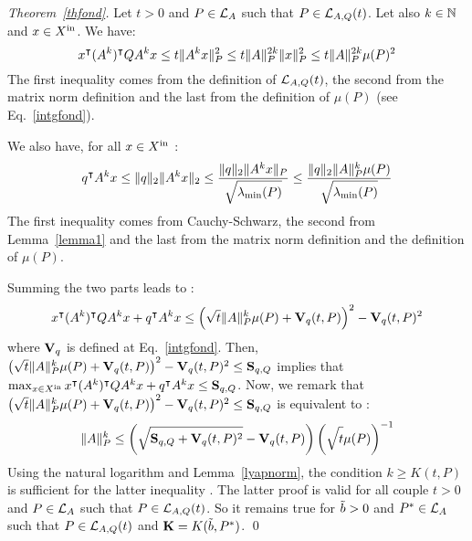 \documentclass[10pt]{llncs}
\begin{document}
\begin{proof}[Theorem~\ref{thfond}]
Let $t>0$ and $P\in\mathcal{L}_{A}$ such that $P\in\mathcal{L}_{A,Q}(t)$. Let also $k\in\mathbb{N}$ and $x\in X^\mathrm{in}$. We have:
\[
x^\intercal (A^k)^\intercal Q A^k x  
\leq  t \| A^k x\|_P^2\leq t\| A\|^{2k}_P \| x\|^2_P
\leq t\| A\|_P^{2k} \mu(P)^2
\]
The first inequality comes from the definition of $\mathcal{L}_{A,Q}(t)$, the second from the matrix norm definition and the last from the definition of $\mu(P)$ (see Eq.~\eqref{intgfond}).

We also have, for all $x\in X^\mathrm{in}$ :
\[
q^\intercal A^k x
\leq \| q\|_2 \| A^k x\|_2\leq \dfrac{\| q\|_2 \| A^k x\|_P}{\sqrt{\strut \lambda_{\operatorname{min}}(P)}} 
\leq \dfrac{\| q\|_2\| A\|_P^{k} \mu(P)}{\sqrt{\strut \lambda_{\operatorname{min}}(P)}}
\]
The first inequality comes from Cauchy-Schwarz, the second from Lemma~\ref{lemma1} and the last from the matrix norm definition and the definition of $\mu(P)$. 

Summing the two parts leads to :
\[
x^\intercal (A^k)^\intercal Q A^k x+q^\intercal A^k x\leq \left(\sqrt{t}\| A\|_P^k\mu(P)+\mathbf{V}_{q}(t,P)\right)^2-\mathbf{V}_{q}(t,P)^2
\]
where $\mathbf{V}_{q}$ is defined at Eq.~\eqref{intgfond}. Then, $ \left(\sqrt{t}\| A\|_P^k\mu(P)+\mathbf{V}_{q}(t,P)\right)^2-\mathbf{V}_{q}(t,P)^2\leq \mathbf{S}_{q,Q}$ implies that $ \max_{x\in X^\mathrm{in}} x^\intercal (A^k)^\intercal Q A^k x+q^\intercal A^k x\leq \mathbf{S}_{q,Q}$. Now, we remark that  $\left(\sqrt{t}\| A\|_P^k\mu(P)+\mathbf{V}_{q}(t,P)\right)^2-\mathbf{V}_{q}(t,P)^2\leq \mathbf{S}_{q,Q}$ is equivalent to :
\[
\| A\|_P^k\leq \left(\sqrt{\strut \mathbf{S}_{q,Q}+\mathbf{V}_{q}(t,P)^2}-\mathbf{V}_{q}(t,P)\right)\left(\sqrt{\strut t}\mu(P)\right)^{-1}
\]
Using the natural logarithm and Lemma~\ref{lyapnorm}, the condition  $k\geq K(t,P)$ is sufficient for the latter inequality .  The latter proof is valid for all couple $t>0$ and $P\in\mathcal{L}_{A}$ such that $P\in\mathcal{L}_{A,Q}(t)$. So it remains true for   $\tilde{b}>0$ and $P^*\in\mathcal{L}_{A}$ such that $P\in\mathcal{L}_{A,Q}(t)$ and $\mathbf{K}=K(\tilde{b},P^*)$. 
\qed
\end{proof}
\end{document}

